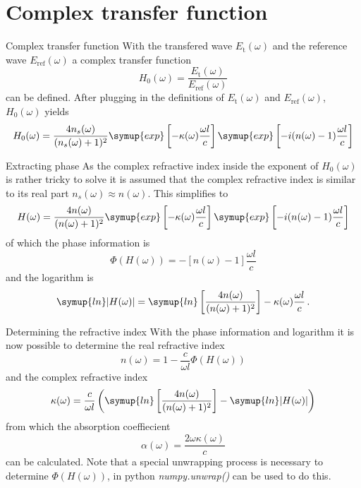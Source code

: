 \documentclass[aspectratio=1610, 9pt]{beamer}
\begin{document}
\section{Complex transfer function}
\begin{frame}{Complex transfer function}
  With the transfered wave $E_\text{t}(\omega)$ and the reference wave $E_\text{ref}(\omega)$ a complex transfer function 
  \begin{equation}
    H_0(\omega) = \frac{E_\text{t}(\omega)}{E_\text{ref}(\omega)}
  \end{equation}
  can be defined.
  After plugging in the definitions of $E_\text{t}(\omega)$ and $E_\text{ref}(\omega)$, $H_0(\omega)$ yields
  \begin{equation}
    H_0 (\omega) = \frac{4 n_s(\omega)}{(n_s(\omega) +1)^2} \symup{exp}\left[-\kappa(\omega) \frac{\omega l }{c}\right] \symup{exp}\left[-i (n (\omega) - 1) \frac{\omega l}{c}\right]
  \end{equation}
  \end{frame}

\begin{frame}{Extracting phase}
  As the complex refractive index inside the exponent of $H_0(\omega)$ is rather tricky to solve it is assumed that the complex refractive index is similar to its real part $n_s(\omega) \approx n(\omega)$.
  This simplifies to 
  \begin{equation}
    H(\omega) = \frac{4n(\omega)}{(n(\omega) + 1)^2} \symup{exp}\left[-\kappa(\omega) \frac{\omega l }{c}\right] \symup{exp}\left[- i(n(\omega) - 1) \frac{\omega l}{c}\right]
  \end{equation}
  of which the phase information is
  \begin{equation}
    \Phi(H(\omega)) = -[n(\omega) - 1] \frac{\omega l}{c}
  \end{equation}
  and the logarithm is
  \begin{equation}
    \symup{ln}|H(\omega)| = \symup{ln}\left[ \frac{4n(\omega)}{(n(\omega) +1)^2}\right] - \kappa(\omega) \frac{\omega l}{c} \, .
  \end{equation}
\end{frame}

\begin{frame}{Determining the refractive index}
  With the phase information and logarithm it is now possible to determine the real refractive index 
  \begin{equation}
    n(\omega) = 1 - \frac{c}{\omega l} \Phi(H(\omega))
  \end{equation}
  and the complex refractive index 
  \begin{equation}
    \kappa(\omega) = \frac{c}{\omega l } \left( \symup{ln}\left[ \frac{4 n(\omega)}{(n(\omega) + 1)^2}\right] - \symup{ln}|H(\omega)|\right)
  \end{equation}
  from which the absorption coeffiecient
  \begin{equation}
    \alpha(\omega) = \frac{2 \omega \kappa(\omega)}{c}
  \end{equation}
  can be calculated.
  Note that a special unwrapping process is necessary to determine $\Phi(H(\omega))$, in python \textit{numpy.unwrap()} can be used to do this.
\end{frame}
\end{document}

